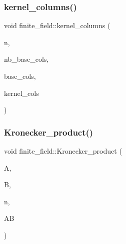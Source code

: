 \subsubsection{\texorpdfstring{kernel\+\_\+columns()}{kernel\_columns()}}
{\footnotesize\ttfamily void finite\+\_\+field\+::kernel\+\_\+columns (\begin{DoxyParamCaption}\item[{\mbox{\hyperlink{galois_8h_a09fddde158a3a20bd2dcadb609de11dc}{I\+NT}}}]{n,  }\item[{\mbox{\hyperlink{galois_8h_a09fddde158a3a20bd2dcadb609de11dc}{I\+NT}}}]{nb\+\_\+base\+\_\+cols,  }\item[{\mbox{\hyperlink{galois_8h_a09fddde158a3a20bd2dcadb609de11dc}{I\+NT}} $\ast$}]{base\+\_\+cols,  }\item[{\mbox{\hyperlink{galois_8h_a09fddde158a3a20bd2dcadb609de11dc}{I\+NT}} $\ast$}]{kernel\+\_\+cols }\end{DoxyParamCaption})}

\mbox{\label{classfinite__field_af4988e23de0347675d5a2c2dd654e098}} 
\subsubsection{\texorpdfstring{Kronecker\+\_\+product()}{Kronecker\_product()}}
{\footnotesize\ttfamily void finite\+\_\+field\+::\+Kronecker\+\_\+product (\begin{DoxyParamCaption}\item[{\mbox{\hyperlink{galois_8h_a09fddde158a3a20bd2dcadb609de11dc}{I\+NT}} $\ast$}]{A,  }\item[{\mbox{\hyperlink{galois_8h_a09fddde158a3a20bd2dcadb609de11dc}{I\+NT}} $\ast$}]{B,  }\item[{\mbox{\hyperlink{galois_8h_a09fddde158a3a20bd2dcadb609de11dc}{I\+NT}}}]{n,  }\item[{\mbox{\hyperlink{galois_8h_a09fddde158a3a20bd2dcadb609de11dc}{I\+NT}} $\ast$}]{AB }\end{DoxyParamCaption})}

\mbox{\label{classfinite__field_a07a0b166b3dce1d0f365db1112429758}} 
